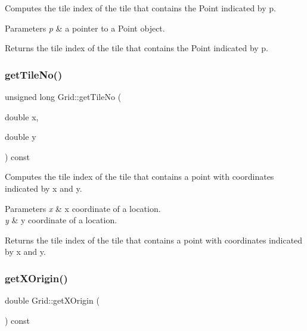 Computes the tile index of the tile that contains the Point indicated by p. 
\begin{DoxyParams}{Parameters}
{\em p} & a pointer to a Point object. \\
\hline
\end{DoxyParams}
\begin{DoxyReturn}{Returns}
the tile index of the tile that contains the Point indicated by p. 
\end{DoxyReturn}
\mbox{\label{class_grid_a02dee9ad3ee575623916c0041f72eb5e}} 
\subsubsection{\texorpdfstring{get\+Tile\+No()}{getTileNo()}\hspace{0.1cm}{\footnotesize\ttfamily [2/2]}}
{\footnotesize\ttfamily unsigned long Grid\+::get\+Tile\+No (\begin{DoxyParamCaption}\item[{double}]{x,  }\item[{double}]{y }\end{DoxyParamCaption}) const}

Computes the tile index of the tile that contains a point with coordinates indicated by x and y. 
\begin{DoxyParams}{Parameters}
{\em x} & x coordinate of a location. \\
\hline
{\em y} & y coordinate of a location. \\
\hline
\end{DoxyParams}
\begin{DoxyReturn}{Returns}
the tile index of the tile that contains a point with coordinates indicated by x and y. 
\end{DoxyReturn}
\mbox{\label{class_grid_a08b534c7f8e1099a6903bf08d9727842}} 
\subsubsection{\texorpdfstring{get\+X\+Origin()}{getXOrigin()}}
{\footnotesize\ttfamily double Grid\+::get\+X\+Origin (\begin{DoxyParamCaption}{ }\end{DoxyParamCaption}) const}

